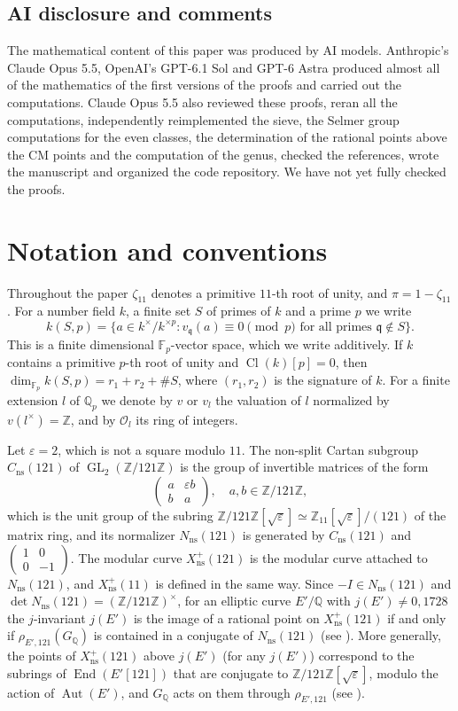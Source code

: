 \documentclass[11pt,reqno]{amsart}
\DeclareMathOperator{\GL}{GL}
\DeclareMathOperator{\End}{End}
\DeclareMathOperator{\Aut}{Aut}
\DeclareMathOperator{\Cl}{Cl}
\newcommand{\Q}{\mathbb{Q}}
\newcommand{\Z}{\mathbb{Z}}
\newcommand{\F}{\mathbb{F}}
\newcommand{\OO}{\mathcal{O}}
\newcommand{\fq}{\mathfrak{q}}
\newcommand{\ns}{\mathrm{ns}}
\newcommand{\Xns}[1]{X_{\ns}^+(#1)}
\theoremstyle{definition}
\numberwithin{equation}{section}
\begin{document}
\subsection*{AI disclosure and comments}
The mathematical content of this paper was produced by AI models. Anthropic's Claude Opus 5.5, OpenAI's GPT-6.1 Sol and GPT-6 Astra produced almost all of the mathematics of the first versions of the proofs and carried out the computations. Claude Opus 5.5 also reviewed these proofs, reran all the computations, independently reimplemented the sieve, the Selmer group computations for the even classes, the determination of the rational points above the CM points and the computation of the genus, checked the references, wrote the manuscript and organized the code repository. We have not yet fully checked the proofs.

\section{Notation and conventions}\label{sec:notation}

Throughout the paper $\zeta_{11}$ denotes a primitive $11$-th root of unity, and $\pi=1-\zeta_{11}$. For a number field $k$, a finite set $S$ of primes of $k$ and a prime $p$ we write
$$k(S,p)=\{a\in k^\times/k^{\times p} : v_{\fq}(a)\equiv 0 \pmod p \text{ for all primes } \fq\notin S\}.$$
This is a finite dimensional $\F_p$-vector space, which we write additively. If $k$ contains a primitive $p$-th root of unity and $\Cl(k)[p]=0$, then $\dim_{\F_p} k(S,p)=r_1+r_2+\#S$, where $(r_1,r_2)$ is the signature of $k$. For a finite extension $l$ of $\Q_p$ we denote by $v$ or $v_l$ the valuation of $l$ normalized by $v(l^\times)=\Z$, and by $\OO_l$ its ring of integers.

Let $\varepsilon=2$, which is not a square modulo $11$. The non-split Cartan subgroup $C_{\ns}(121)$ of $\GL_2(\Z/121\Z)$ is the group of invertible matrices of the form
$$\begin{pmatrix} a & \varepsilon b \\ b & a\end{pmatrix}, \quad a,b\in \Z/121\Z,$$
which is the unit group of the subring $\Z/121\Z[\sqrt\varepsilon]\simeq \Z_{11}[\sqrt \varepsilon]/(121)$ of the matrix ring, and its normalizer $N_{\ns}(121)$ is generated by $C_{\ns}(121)$ and $\begin{pmatrix}1&0\\0&-1\end{pmatrix}$. The modular curve $\Xns{121}$ is the modular curve attached to $N_{\ns}(121)$, and $\Xns{11}$ is defined in the same way. Since $-I\in N_{\ns}(121)$ and $\det N_{\ns}(121)=(\Z/121\Z)^\times$, for an elliptic curve $E'/\Q$ with $j(E')\neq 0,1728$ the $j$-invariant $j(E')$ is the image of a rational point on $\Xns{121}$ if and only if $\rho_{E',121}(G_\Q)$ is contained in a conjugate of $N_{\ns}(121)$ (see \cite[Proposition 3.3]{Zywina15}). More generally, the points of $\Xns{121}$ above $j(E')$ (for any $j(E')$) correspond to the subrings of $\End(E'[121])$ that are conjugate to $\Z/121\Z[\sqrt\varepsilon]$, modulo the action of $\Aut(E')$, and $G_\Q$ acts on them through $\rho_{E',121}$ (see \cite[Section 2.3]{RSZB22}).
\end{document}
